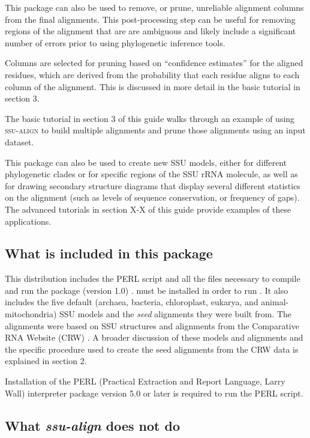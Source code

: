This package can also be used to remove, or prune, unreliable
alignment columns from the final alignments.  This post-processing
step can be useful for removing regions of the alignment that are
are ambiguous and likely include a significant number of errors prior
to using phylogenetic inference tools.

Columns are selected for pruning based on ``confidence estimates'' 
for the aligned residues, which are derived from the probability that
each residue aligns to each column of the alignment. This is discussed
in more detail in the basic tutorial in section 3.

The basic tutorial in section 3 of this guide walks through an example
of using \textsc{ssu-align} to build multiple alignments and prune
those alignments using an input dataset. 

This package can also be used to create new SSU models, either for
different phylogenetic clades or for specific regions of the SSU rRNA
molecule, as well as for drawing secondary structure diagrams that
display several different statistics on the alignment (such as levels
of sequence conservation, or frequency of gaps). The advanced
tutorials in section X-X of this guide provide examples of these 
applications. 

\subsection{What is included in this package}

This distribution includes the PERL script  and
all the files necessary to compile and run the 
package (version 1.0) \cite{Nawrocki09}.  must be
installed in order to run .  It also includes the
five default (archaea, bacteria, chloroplast, eukarya, and
animal-mitochondria) SSU models and the \emph{seed} alignments they
were built from. The alignments were based on SSU structures and
alignments from the Comparative RNA Website (CRW) \cite{Cannone02}. A
broader discussion of these models and alignments and the specific
procedure used to create the seed alignments from the CRW data is
explained in section 2.

Installation of the PERL (Practical Extraction and Report Language,
Larry Wall) interpreter package version 5.0 or later is required to
run the  PERL script.

\subsection{What \emph{ssu-align} does not do}

